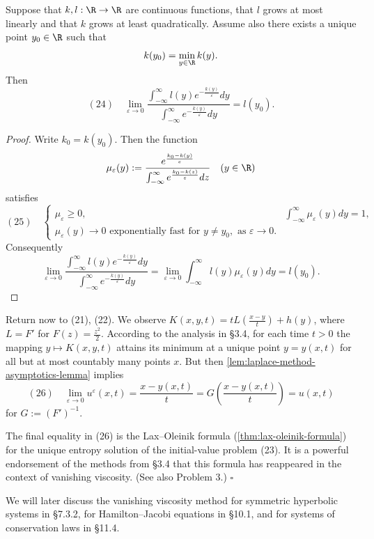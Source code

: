 \begin{example}
\begin{lemma}
\label{lem:laplace-method-asymptotics-lemma}
Suppose that $k,l : \R \to \R$ are continuous functions, that $l$ grows at most linearly and that $k$ grows at least quadratically. Assume also there exists a unique point $y_0 \in \R$ such that
$$k(y_0) = \min_{y \in \R} k(y).$$
Then
$$(24) \quad \lim_{\varepsilon \to 0} \frac{\int_{-\infty}^{\infty} l(y) e^{-\frac{k(y)}{\varepsilon}} dy}{\int_{-\infty}^{\infty} e^{-\frac{k(y)}{\varepsilon}} dy} = l(y_0).$$
\end{lemma}
\begin{proof}
Write $k_0 = k(y_0)$. Then the function
$$\mu_\varepsilon(y) := \frac{e^{\frac{k_0-k(y)}{\varepsilon}}}{\int_{-\infty}^{\infty} e^{\frac{k_0-k(z)}{\varepsilon}} dz} \quad (y \in \R)$$
satisfies
$$(25) \quad \begin{cases}
\mu_\varepsilon \geq 0, & \int_{-\infty}^{\infty} \mu_\varepsilon(y) dy = 1, \\
\mu_\varepsilon(y) \to 0 \text{ exponentially fast for } y \neq y_0, \text{ as } \varepsilon \to 0.
\end{cases}$$
Consequently
$$\lim_{\varepsilon \to 0} \frac{\int_{-\infty}^{\infty} l(y)e^{-\frac{k(y)}{\varepsilon}} dy}{\int_{-\infty}^{\infty} e^{-\frac{k(y)}{\varepsilon}} dy} = \lim_{\varepsilon \to 0} \int_{-\infty}^{\infty} l(y)\mu_\varepsilon(y) dy = l(y_0).$$
\end{proof}

Return now to (21), (22). We observe $K(x, y, t) = tL\left(\frac{x-y}{t}\right) + h(y)$, where $L = F'$ for $F(z) = \frac{z^2}{2}$. According to the analysis in \S3.4, for each time $t > 0$ the mapping $y \mapsto K(x, y, t)$ attains its minimum at a unique point $y = y(x, t)$ for all but at most countably many points $x$. But then \cref{lem:laplace-method-asymptotics-lemma} implies
$$(26) \quad \lim_{\varepsilon \to 0} u^\varepsilon(x, t) = \frac{x - y(x,t)}{t} = G\left(\frac{x - y(x,t)}{t}\right) = u(x, t)$$
for $G := (F')^{-1}$.

The final equality in (26) is the Lax--Oleinik formula (\cref{thm:lax-oleinik-formula}) for the unique entropy solution of the initial-value problem (23). It is a powerful endorsement of the methods from \S3.4 that this formula has reappeared in the context of vanishing viscosity. (See also Problem 3.) $\square$

We will later discuss the vanishing viscosity method for symmetric hyperbolic systems in \S7.3.2, for Hamilton--Jacobi equations in \S10.1, and for systems of conservation laws in \S11.4.
\end{example}

